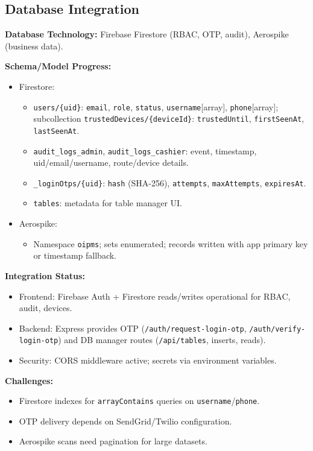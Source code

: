 \documentclass[12pt]{article}
\begin{document}
\subsection{Database Integration}
\textbf{Database Technology:} Firebase Firestore (RBAC, OTP, audit), Aerospike (business data).

\textbf{Schema/Model Progress:}
\begin{itemize}[leftmargin=*]
\item Firestore:
  \begin{itemize}
  \item \texttt{users/\{uid\}}: \texttt{email}, \texttt{role}, \texttt{status}, \texttt{username}[array], \texttt{phone}[array]; subcollection \texttt{trustedDevices/\{deviceId\}}: \texttt{trustedUntil}, \texttt{firstSeenAt}, \texttt{lastSeenAt}.
  \item \texttt{audit\_logs\_admin}, \texttt{audit\_logs\_cashier}: event, timestamp, uid/email/username, route/device details.
  \item \texttt{\_loginOtps/\{uid\}}: \texttt{hash} (SHA-256), \texttt{attempts}, \texttt{maxAttempts}, \texttt{expiresAt}.
  \item \texttt{tables}: metadata for table manager UI.
  \end{itemize}
\item Aerospike:
  \begin{itemize}
  \item Namespace \texttt{oipms}; sets enumerated; records written with app primary key or timestamp fallback.
  \end{itemize}
\end{itemize}

\textbf{Integration Status:}
\begin{itemize}[leftmargin=*]
\item Frontend: Firebase Auth + Firestore reads/writes operational for RBAC, audit, devices.
\item Backend: Express provides OTP (\texttt{/auth/request-login-otp}, \texttt{/auth/verify-login-otp}) and DB manager routes (\texttt{/api/tables}, inserts, reads).
\item Security: CORS middleware active; secrets via environment variables.
\end{itemize}

\textbf{Challenges:}
\begin{itemize}[leftmargin=*]
\item Firestore indexes for \texttt{arrayContains} queries on \texttt{username}/\texttt{phone}.
\item OTP delivery depends on SendGrid/Twilio configuration.
\item Aerospike scans need pagination for large datasets.
\end{itemize}
\end{document}
